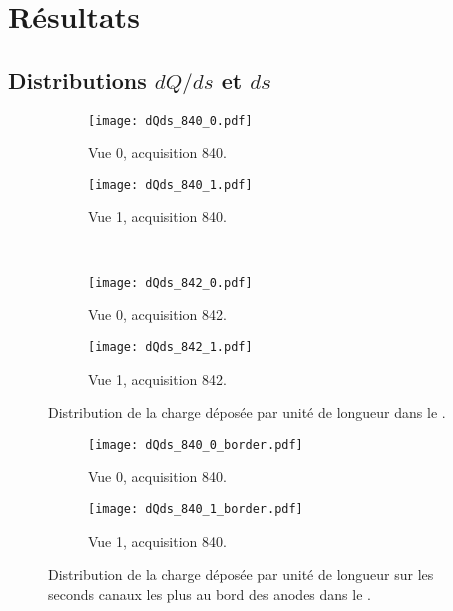   \section{Résultats}\label{sec::results-311}

    \subsection{Distributions $dQ/ds$ et $ds$}

      \begin{figure}[htbp]
        \centering
        \begin{subfigure}[t]{0.48\textwidth}
          \centering
          \texttt{[image: dQds\_840\_0.pdf]}
          \caption{Vue 0, acquisition 840.}
        \end{subfigure}\hfill
        \begin{subfigure}[t]{0.48\textwidth}
          \centering
          \texttt{[image: dQds\_840\_1.pdf]}
           \caption{Vue 1, acquisition 840.}
        \end{subfigure}\\
        \begin{subfigure}[t]{0.48\textwidth}
          \centering
          \texttt{[image: dQds\_842\_0.pdf]}
          \caption{Vue 0, acquisition 842.}
        \end{subfigure}\hfill
        \begin{subfigure}[t]{0.48\textwidth}
          \centering
          \texttt{[image: dQds\_842\_1.pdf]}
          \caption{Vue 1, acquisition 842.}
        \end{subfigure}
        \caption[Distribution de la charge déposée par unité de longueur dans le \TOO{}]{\label{fig::dqds_840_842}Distribution de la charge déposée par unité de longueur dans le \TOO{}.}
      \end{figure}

      \begin{figure}[htbp]
        \centering
        \begin{subfigure}[t]{0.48\textwidth}
          \centering
          \texttt{[image: dQds\_840\_0\_border.pdf]}
          \caption{Vue 0, acquisition 840.}
        \end{subfigure}\hfill
        \begin{subfigure}[t]{0.48\textwidth}
          \centering
          \texttt{[image: dQds\_840\_1\_border.pdf]}
          \caption{Vue 1, acquisition 840.}
        \end{subfigure}
        \caption[Effet des zones mortes des LEMs dans le \TOO{}]{\label{fig::dqds_840_borders}Distribution de la charge déposée par unité de longueur sur les seconds canaux les plus au bord des anodes dans le \TOO{}.}
      \end{figure}
      
